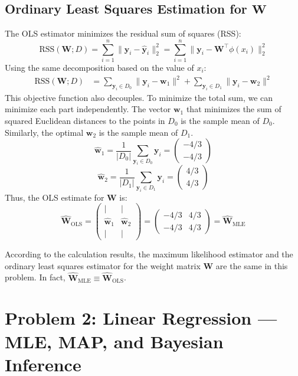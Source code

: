 \documentclass[11pt, a4paper, oneside]{memoir}
\begin{document}
\section[Ordinary Least Squares Estimation for W]{Ordinary Least Squares Estimation for $\mathbf{W}$}
The OLS estimator minimizes the residual sum of squares (RSS):
\[ \text{RSS}(\mathbf{W} ; D) = \sum_{i=1}^n \| \mathbf{y}_i - \hat{\mathbf{y}}_i \|_2^2 = \sum_{i=1}^n \| \mathbf{y}_i - \mathbf{W}^\top\phi(x_i) \|_2^2 \]
Using the same decomposition based on the value of $x_i$:
\begin{align*}
    \text{RSS}(\mathbf{W} ; D) &= \sum_{\mathbf{y}_i \in D_0} \| \mathbf{y}_i - \mathbf{w}_1 \|^2 + \sum_{\mathbf{y}_i \in D_1} \| \mathbf{y}_i - \mathbf{w}_2 \|^2
\end{align*}
This objective function also decouples. To minimize the total sum, we can minimize each part independently. The vector $\mathbf{w}_1$ that minimizes the sum of squared Euclidean distances to the points in $D_0$ is the sample mean of $D_0$. Similarly, the optimal $\mathbf{w}_2$ is the sample mean of $D_1$.
\[ \hat{\mathbf{w}}_1 = \frac{1}{|D_0|} \sum_{\mathbf{y}_i \in D_0} \mathbf{y}_i = \begin{pmatrix} -4/3 \\ -4/3 \end{pmatrix} \]
\[ \hat{\mathbf{w}}_2 = \frac{1}{|D_1|} \sum_{\mathbf{y}_i \in D_1} \mathbf{y}_i = \begin{pmatrix} 4/3 \\ 4/3 \end{pmatrix} \]
Thus, the OLS estimate for $\mathbf{W}$ is:
\[ \hat{\mathbf{W}}_{\text{OLS}} = \begin{pmatrix} | & | \\ \hat{\mathbf{w}}_1 & \hat{\mathbf{w}}_2 \\ | & | \end{pmatrix} = \begin{pmatrix} -4/3 & 4/3 \\ -4/3 & 4/3 \end{pmatrix} = \hat{\mathbf{W}}_{\text{MLE}} \]

According to the calculation results, the maximum likelihood estimator and the ordinary least squares estimator for the weight matrix $\mathbf{W}$ are the same in this problem. In fact, $\hat{\mathbf{W}}_{\text{MLE}} \equiv \hat{\mathbf{W}}_{\text{OLS}}$.

\chapter{Problem 2: Linear Regression — MLE, MAP, and Bayesian Inference}
\end{document}
